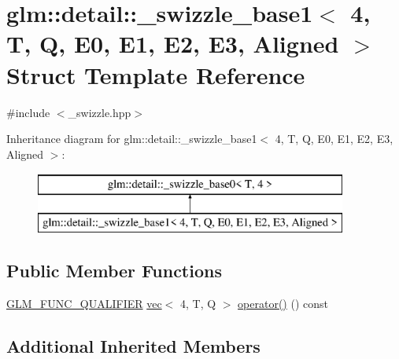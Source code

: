 \hypertarget{structglm_1_1detail_1_1__swizzle__base1_3_014_00_01_t_00_01_q_00_01_e0_00_01_e1_00_01_e2_00_01_e3_00_01_aligned_01_4}{}\section{glm\+:\+:detail\+:\+:\+\_\+swizzle\+\_\+base1$<$ 4, T, Q, E0, E1, E2, E3, Aligned $>$ Struct Template Reference}
\label{structglm_1_1detail_1_1__swizzle__base1_3_014_00_01_t_00_01_q_00_01_e0_00_01_e1_00_01_e2_00_01_e3_00_01_aligned_01_4}


{\ttfamily \#include $<$\+\_\+swizzle.\+hpp$>$}

Inheritance diagram for glm\+:\+:detail\+:\+:\+\_\+swizzle\+\_\+base1$<$ 4, T, Q, E0, E1, E2, E3, Aligned $>$\+:\begin{figure}[H]
\begin{center}
\leavevmode
\includegraphics[height=2.000000cm]{structglm_1_1detail_1_1__swizzle__base1_3_014_00_01_t_00_01_q_00_01_e0_00_01_e1_00_01_e2_00_01_e3_00_01_aligned_01_4}
\end{center}
\end{figure}
\subsection*{Public Member Functions}
\begin{DoxyCompactItemize}
\item 
\mbox{\hyperlink{setup_8hpp_a33fdea6f91c5f834105f7415e2a64407}{G\+L\+M\+\_\+\+F\+U\+N\+C\+\_\+\+Q\+U\+A\+L\+I\+F\+I\+ER}} \mbox{\hyperlink{structglm_1_1vec}{vec}}$<$ 4, T, Q $>$ \mbox{\hyperlink{structglm_1_1detail_1_1__swizzle__base1_3_014_00_01_t_00_01_q_00_01_e0_00_01_e1_00_01_e2_00_01_e3_00_01_aligned_01_4_a4f7066f4879ee4e9a999748d556c9198}{operator()}} () const
\end{DoxyCompactItemize}
\subsection*{Additional Inherited Members}


